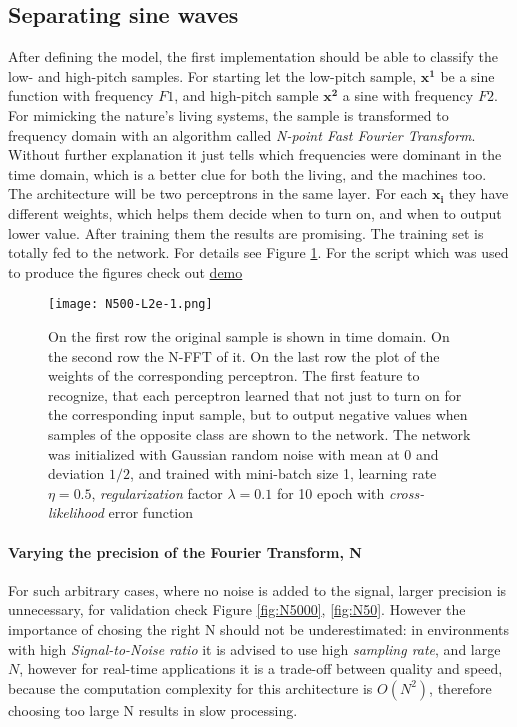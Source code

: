 \subsection{Separating sine waves}
After defining the model, the first implementation should be able to classify the low- and high-pitch samples. For starting let the low-pitch sample, $\mathbf{x^1}$ be a sine function with frequency $F1$, and high-pitch sample $\mathbf{x^2}$ a sine with frequency $F2$. For mimicking the nature's living systems, the sample is transformed to frequency domain with an algorithm called \emph{N-point Fast Fourier Transform}. Without further explanation it just tells which frequencies were dominant in the time domain, which is a better clue for both the living, and the machines too. The architecture will be two perceptrons in the same layer. For each $\mathbf{x_i}$ they have different weights, which helps them decide when to turn on, and when to output lower value. After training them the results are promising. The training set is totally fed to the network. For details see Figure \ref{fig:N500}. For the script which was used to produce the figures check out \href{https://github.com/botcs/deepvision/tree/master/demo/audio}{demo}

\begin{figure}
	\centering
	\texttt{[image: N500-L2e-1.png]}
	\caption{On the first row the original sample is shown in time domain. On the second row the N-FFT of it. On the last row the plot of the weights of the corresponding perceptron. The first feature to recognize, that each perceptron learned that not just to turn on for the corresponding input sample, but to output negative values when samples of the opposite class are shown to the network. The network was initialized with Gaussian random noise with mean at 0 and deviation $1/2$, and trained with mini-batch size 1, learning rate $\eta=0.5$, \emph{regularization} factor $\lambda=0.1$ for 10 epoch with \emph{cross-likelihood} error function}
	
	\label{fig:N500}
\end{figure}

\paragraph{Varying the precision of the Fourier Transform, N}
For such arbitrary cases, where no noise is added to the signal, larger precision is unnecessary, for validation check Figure \ref{fig:N5000}, \ref{fig:N50}. However the importance of chosing the right N should not be underestimated: in environments with high \emph{Signal-to-Noise ratio} it is advised to use high \emph{sampling rate}, and large $N$, however for real-time applications it is a trade-off between quality and speed, because the computation complexity for this architecture is $O(N^2)$, therefore choosing too large N results in slow processing.

